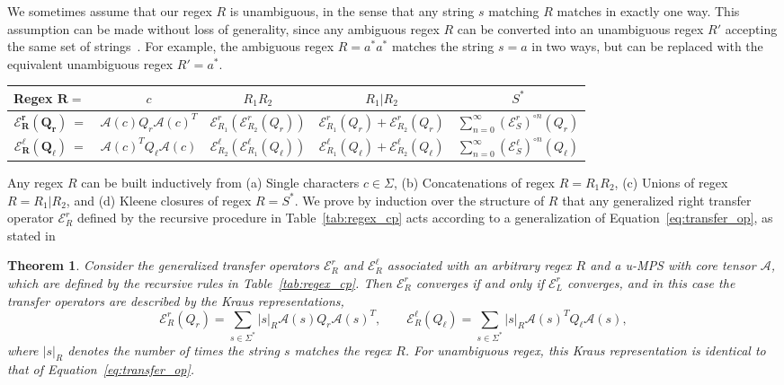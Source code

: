 \documentclass[twoside]{article}
\newtheorem{theorem}{Theorem}
\newcommand{\EL}{\mc{E}^{\scriptstyle \ell}}
\newcommand{\ER}{\mc{E}^{\scriptstyle r}}
\newcommand{\QL}{Q_{\ell}}
\newcommand{\QR}{Q_{r}}
\newcommand{\sR}{|s|_R}
\newcommand{\mc}[1]{\mathcal{#1}}
\begin{document}
We sometimes assume that our regex $R$ is unambiguous, in the sense that any string $s$ matching $R$ matches in exactly one way. This assumption can be made without loss of generality, since any ambiguous regex $R$ can be converted into an unambiguous regex $R'$ accepting the same set of strings~\citep{book1971}. For example, the ambiguous regex $R = a^*a^*$ matches the string $s = a$ in two ways, but can be replaced with the equivalent unambiguous regex $R' = a^*$. 
%
\begin{table}[t]
\begin{center}
\begin{small}
\begin{sc}
\begin{tabular}{c|cccc}
    \textbf{Regex} $\mathbf{R =\ }$ & $c$ & $R_1 R_2$ & $R_1 | R_2$ & $S^*$ \\
    \midrule
    $\bm{\ER_R(\QR)}\ = $ & $\mc{A}(c) \QR \mc{A}(c)^T$ & $\ER_{R_1}(\ER_{R_2}(\QR))$ & $\ER_{R_1}(\QR) + \ER_{R_2}(\QR)$ & $\sum_{n=0}^\infty (\ER_S)^{\circ n}(\QR)$ \\
    $\bm{\EL_R(\QL)}\ = $ & $\mc{A}(c)^T \QL \mc{A}(c)$ & $\EL_{R_2}(\EL_{R_1}(\QL))$ & $\EL_{R_1}(\QL) + \EL_{R_2}(\QL)$ & $\sum_{n=0}^\infty (\EL_S)^{\circ n}(\QL)$
\end{tabular}
\end{sc}
\end{small}
\end{center}
\vskip -0.1in
\end{table}

Any regex $R$ can be built inductively from (a) Single characters $c\in\Sigma$, (b) Concatenations of regex $R = R_1 R_2$, (c) Unions of regex $R = R_1 | R_2$, and (d) Kleene closures of regex $R = S^*$. We prove by induction over the structure of $R$ that any generalized right transfer operator $\ER_R$ defined by the recursive procedure in Table~\ref{tab:regex_cp} 
acts according to a generalization of Equation~\ref{eq:transfer_op}, 
as stated in

\begin{theorem}
\label{thm:transfer_op}
Consider the generalized transfer operators $\ER_R$ and $\EL_R$ associated with an arbitrary regex $R$ and a u-MPS with core tensor $\mc{A}$, which are defined by the recursive rules in Table~\ref{tab:regex_cp}. 
Then $\ER_R$ converges if and only if $\ER_L$ converges, and in this case the transfer operators are described by the Kraus representations,
\begin{equation}
\label{eq:gen_transfer_op}
\ER_R(\QR) = \sum_{s\in \Sigma^*} \sR \mc{A}(s) \QR \mc{A}(s)^T, \qquad \EL_R(\QL) = \sum_{s\in \Sigma^*} \sR \mc{A}(s)^T \QL \mc{A}(s),
\end{equation}
where $\sR$ denotes the number of times the string $s$ matches the regex $R$. For unambiguous regex, this Kraus representation is identical to that of Equation~\eqref{eq:transfer_op}.
\end{theorem}
\end{document}
